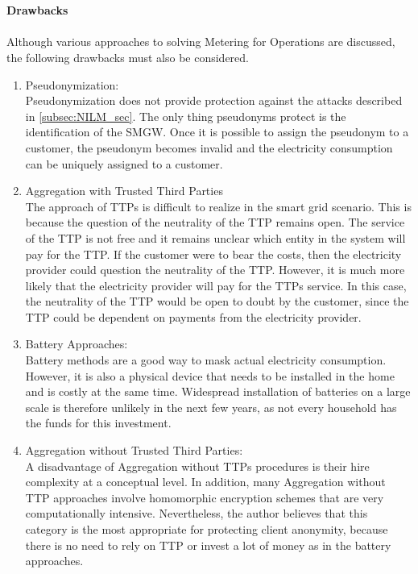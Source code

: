\\
\\
\textbf{Drawbacks}
\\
\\
Although various approaches to solving Metering for Operations are discussed, the following drawbacks must also be considered.
\begin{enumerate}
\item Pseudonymization:\\
Pseudonymization does not provide protection against the attacks described in \ref{subsec:NILM_sec}. The only thing pseudonyms protect is the identification of the \gls{SMGW}. Once it is possible to assign the pseudonym to a customer, the pseudonym becomes invalid and the electricity consumption can be uniquely assigned to a customer. 

\item Aggregation with Trusted Third Parties\\
The approach of \gls{TTP}s is difficult to realize in the smart grid scenario. This is because the question of the neutrality of the \gls{TTP} remains open. The service of the \gls{TTP} is not free and it remains unclear which entity in the system will pay for the \gls{TTP}. If the customer were to bear the costs, then the electricity provider could question the neutrality of the \gls{TTP}. However, it is much more likely that the electricity provider will pay for the \gls{TTP}s service. In this case, the neutrality of the \gls{TTP} would be open to doubt by the customer, since the \gls{TTP} could be dependent on payments from the electricity provider.

\item Battery Approaches:\\
Battery methods are a good way to mask actual electricity consumption. However, it is also a physical device that needs to be installed in the home and is costly at the same time. Widespread installation of batteries on a large scale is therefore unlikely in the next few years, as not every household has the funds for this investment.

\item Aggregation without Trusted Third Parties:\\
\label{subsec:aggegration_without_ttp}
A disadvantage of Aggregation without \gls{TTP}s procedures is their hire complexity at a conceptual level. In addition, many Aggregation without \gls{TTP} approaches involve homomorphic encryption schemes that are very computationally intensive. Nevertheless, the author believes that this category is the most appropriate for protecting client anonymity, because there is no need to rely on \gls{TTP} or invest a lot of money as in the battery approaches.
\end{enumerate}
